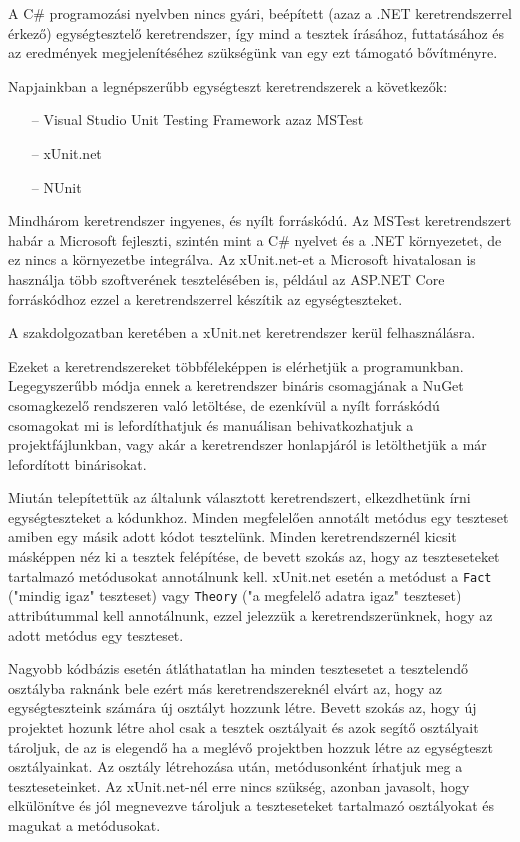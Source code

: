 
A C\# programozási nyelvben nincs gyári, beépített (azaz a .NET keretrendszerrel érkező) egységtesztelő keretrendszer, így mind a tesztek írásához, futtatásához és az eredmények megjelenítéséhez szükségünk van egy ezt támogató bővítményre.

Napjainkban a legnépszerűbb egységteszt keretrendszerek a következők:
\begin{itemize}
    \item[--] Visual Studio Unit Testing Framework azaz MSTest
    \item[--] xUnit.net
    \item[--] NUnit
\end{itemize}

Mindhárom keretrendszer ingyenes, és nyílt forráskódú. Az MSTest keretrendszert habár a Microsoft fejleszti, szintén mint a C\# nyelvet és a .NET környezetet, de ez nincs a környezetbe integrálva. Az xUnit.net-et a Microsoft hivatalosan is használja több szoftverének tesztelésében is, például az ASP.NET Core forráskódhoz ezzel a keretrendszerrel készítik az egységteszteket.

A szakdolgozatban keretében a xUnit.net keretrendszer kerül felhasználásra.

Ezeket a keretrendszereket többféleképpen is elérhetjük a programunkban.
Legegyszerűbb módja ennek a keretrendszer bináris csomagjának a NuGet csomagkezelő rendszeren való letöltése, de ezenkívül a nyílt forráskódú csomagokat mi is lefordíthatjuk és manuálisan behivatkozhatjuk a projektfájlunkban, vagy akár a keretrendszer honlapjáról is letölthetjük a már lefordított binárisokat.

Miután telepítettük az általunk választott keretrendszert, elkezdhetünk írni egységteszteket a kódunkhoz. Minden megfelelően annotált metódus egy teszteset amiben egy másik adott kódot tesztelünk. Minden keretrendszernél kicsit másképpen néz ki a tesztek felépítése, de bevett szokás az, hogy az teszteseteket tartalmazó metódusokat annotálnunk kell. xUnit.net esetén a metódust a \texttt{Fact} ("mindig igaz" teszteset) vagy \texttt{Theory} ("a megfelelő adatra igaz" teszteset) attribútummal kell annotálnunk, ezzel jelezzük a keretrendszerünknek, hogy az adott metódus egy teszteset.

Nagyobb kódbázis esetén átláthatatlan ha minden tesztesetet a tesztelendő osztályba raknánk bele ezért más keretrendszereknél elvárt az, hogy az egységteszteink számára új osztályt hozzunk létre. Bevett szokás az, hogy új projektet hozunk létre ahol csak a tesztek osztályait és azok segítő osztályait tároljuk, de az is elegendő ha a meglévő projektben hozzuk létre az egységteszt osztályainkat. Az osztály létrehozása után, metódusonként írhatjuk meg a teszteseteinket. Az xUnit.net-nél erre nincs szükség, azonban javasolt, hogy elkülönítve és jól megnevezve tároljuk a teszteseteket tartalmazó osztályokat és magukat a metódusokat.

